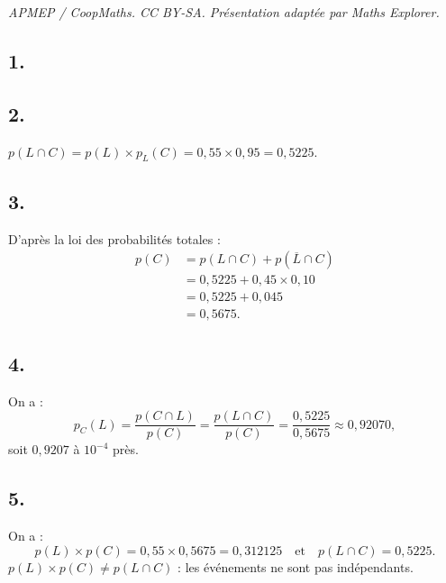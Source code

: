 \documentclass[10pt]{article}
\begin{document}
\noindent\textit{APMEP / CoopMaths. CC BY-SA. Présentation adaptée par Maths Explorer.}\par\medskip
\subsection*{1.}

\begin{center}
\end{center}

\subsection*{2.}

\(p(L \cap C) = p(L) \times p_L(C) = 0{,}55 \times 0{,}95 = 0{,}5225\).

\subsection*{3.}

D'après la loi des probabilités totales :
\begin{align*}
p(C) &= p(L \cap C) + p(\overline{L} \cap C) \\
&= 0{,}5225 + 0{,}45 \times 0{,}10 \\
&= 0{,}5225 + 0{,}045 \\
&= 0{,}5675.
\end{align*}

\subsection*{4.}

On a :
\[
p_C(L) = \dfrac{p(C \cap L)}{p(C)} = \dfrac{p(L \cap C)}{p(C)} = \dfrac{0{,}5225}{0{,}5675} \approx 0{,}92070,
\]
soit \(0{,}9207\) à \(10^{-4}\) près.

\subsection*{5.}

On a :
\[
p(L) \times p(C) = 0{,}55 \times 0{,}5675 = 0{,}312125 \quad \text{et} \quad p(L \cap C) = 0{,}5225.
\]
\( p(L) \times p(C) \neq p(L \cap C) \) : les événements ne sont pas indépendants.
\end{document}
